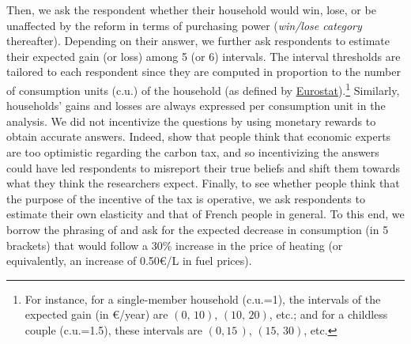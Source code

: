 \documentclass[12pt]{article} %
\begin{document}
Then, we ask the respondent whether their household would win, lose, or be unaffected by the reform in terms of purchasing power (\textit{win/lose category} thereafter). Depending on their answer, we further ask respondents to estimate their expected gain (or loss) among 5 (or 6) intervals. The interval thresholds are tailored to each respondent since they are computed in proportion to the number of consumption units (c.u.) of the household (as defined by \href{http://ec.europa.eu/eurostat/statistics-explained/index.php/Glossary:Equivalised_disposable_income}{Eurostat}).\footnote{For instance, for a single-member household (c.u.=1), the intervals of the expected gain (in \euro{}/year) are $\left(0,\,10\right)$, $\left(10,\,20\right)$, etc.; and for a childless couple (c.u.=1.5), these intervals are $\left(0,15\,\right)$, $\left(15,\,30\right)$, etc.} Similarly, households' gains and losses are always expressed per consumption unit in the analysis. We did not incentivize the questions by using monetary rewards to obtain accurate answers. Indeed, \citet{sapienza_zingales_2013} show that people think that economic experts are too optimistic regarding the carbon tax, and so incentivizing the answers could have led respondents to misreport their true beliefs and shift them towards what they think the researchers expect. Finally, to see whether people think that the purpose of the incentive of the tax is operative, we ask respondents to estimate their own elasticity and that of French people in general. To this end, we borrow the phrasing of \citet{baranzini_effectiveness_2017} and ask for the expected decrease in consumption (in 5 brackets) that would follow a 30\% increase in the price of heating (or equivalently, an increase of 0.50\euro{}/L in fuel prices).


\end{document}

